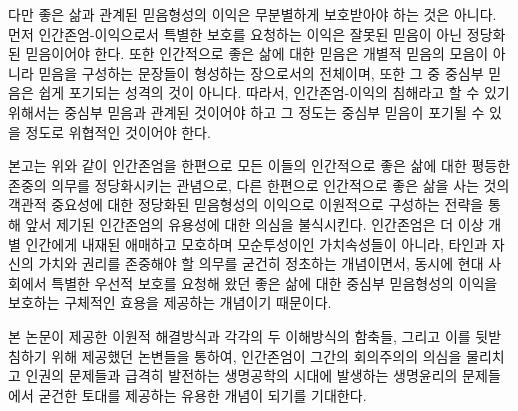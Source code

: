 다만 좋은 삶과 관계된 믿음형성의 이익은 무분별하게 보호받아야 하는 것은 아니다. 먼저 인간존엄-이익으로서 특별한 보호를 요청하는 이익은 잘못된 믿음이 아닌 정당화된 믿음이어야 한다. 또한 인간적으로 좋은 삶에 대한 믿음은 개별적 믿음의 모음이 아니라 믿음을 구성하는 문장들이 형성하는 장으로서의 전체이며, 또한 그 중 중심부 믿음은 쉽게 포기되는 성격의 것이 아니다. 따라서, 인간존엄-이익의 침해라고 할 수 있기 위해서는 중심부 믿음과 관계된 것이어야 하고 그 정도는 중심부 믿음이 포기될 수 있을 정도로 위협적인 것이어야 한다.

본고는 위와 같이 인간존엄을 한편으로 모든 이들의 인간적으로 좋은 삶에 대한 평등한 존중의 의무를 정당화시키는 관념으로, 다른 한편으로 인간적으로 좋은 삶을 사는 것의 객관적 중요성에 대한 정당화된 믿음형성의 이익으로 이원적으로 구성하는 전략을 통해 앞서 제기된 인간존엄의 유용성에 대한 의심을 불식시킨다. 인간존엄은 더 이상 개별 인간에게 내재된 애매하고 모호하며 모순투성이인 가치속성들이 아니라, 타인과 자신의 가치와 권리를 존중해야 할 의무를 굳건히 정초하는 개념이면서, 동시에 현대 사회에서 특별한 우선적 보호를 요청해 왔던 좋은 삶에 대한 중심부 믿음형성의 이익을 보호하는 구체적인 효용을 제공하는 개념이기 때문이다.

본 논문이 제공한 이원적 해결방식과 각각의 두 이해방식의 함축들, 그리고 이를 뒷받침하기 위해 제공했던 논변들을 통하여, 인간존엄이 그간의 회의주의의 의심을 물리치고 인권의 문제들과 급격히 발전하는 생명공학의 시대에 발생하는 생명윤리의 문제들에서 굳건한 토대를 제공하는 유용한 개념이 되기를 기대한다.
